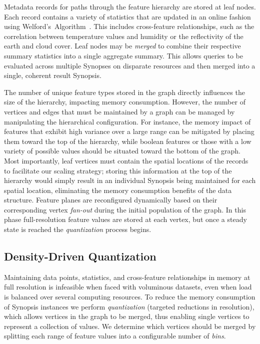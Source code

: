 Metadata records for paths through the feature hierarchy are stored at leaf nodes. Each record contains a variety of statistics that are updated in an online fashion using Welford's~Algorithm~\cite{welford1962note}. This includes cross-feature relationships, such as the correlation between temperature values and humidity or the reflectivity of the earth and cloud cover. Leaf nodes may be \emph{merged} to combine their respective summary statistics into a single aggregate summary. This allows queries to be evaluated across multiple Synopses on disparate resources and then merged into a single, coherent result Synopsis.

The number of unique feature types stored in the graph directly influences the size of the hierarchy, impacting memory consumption. However, the number of vertices and edges that must be maintained by a graph can be managed by manipulating the hierarchical configuration. For instance, the memory impact of features that exhibit high variance over a large range can be mitigated by placing them toward the top of the hierarchy, while boolean features or those with a low variety of possible values should be situated toward the bottom of the graph. Most importantly, leaf vertices must contain the spatial locations of the records to facilitate our scaling strategy; storing this information at the top of the hierarchy would simply result in an individual Synopsis being maintained for each spatial location, eliminating the memory consumption benefits of the data structure. Feature planes are reconfigured dynamically based on their corresponding vertex \emph{fan-out} during the initial population of the graph. In this phase full-resolution feature values are stored at each vertex, but once a steady state is reached the \emph{quantization} process begins.

\subsection{Density-Driven Quantization}
Maintaining data points, statistics, and cross-feature relationships in memory at full resolution is infeasible when faced with voluminous datasets, even when load is balanced over several computing resources. To reduce the memory consumption of Synopsis instances we perform \emph{quantization} (targeted reductions in resolution), which allows vertices in the graph to be merged, thus enabling single vertices to represent a collection of values. We determine which vertices should be merged by splitting each range of feature values into a configurable number of \emph{bins}.

